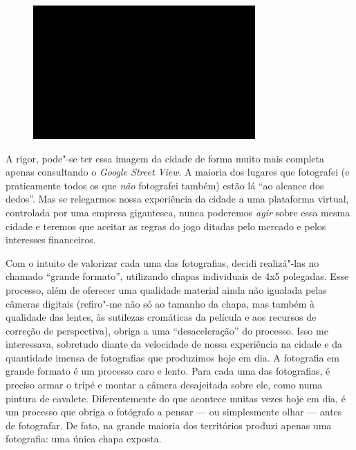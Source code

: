 \begin{figure}[!ht]

\centering
 \includegraphics[width=85mm]{./imgs/im1.jpg}
\caption{\tiny{}}

\end{figure}

A rigor, pode"-se ter essa imagem da cidade de forma muito mais completa
apenas consultando o \emph{Google Street View}. A maioria dos lugares
que fotografei (e praticamente todos os que \emph{não} fotografei
também) estão lá ``ao alcance dos dedos''. Mas se relegarmos nossa
experiência da cidade a uma plataforma virtual, controlada por uma
empresa gigantesca, nunca poderemos \emph{agir} sobre essa mesma cidade
e teremos que aceitar as regras do jogo ditadas pelo mercado e pelos
interesses financeiros.

Com o intuito de valorizar cada uma das fotografias, decidi realizá"-las
no chamado ``grande formato'', utilizando chapas individuais de 4x5
polegadas. Esse processo, além de oferecer uma qualidade material ainda
não igualada pelas câmeras digitais (refiro"-me não só ao tamanho da
chapa, mas também à qualidade das lentes, às sutilezas cromáticas da
película e aos recursos de correção de perspectiva), obriga a uma
``desaceleração'' do processo. Isso me interessava, sobretudo diante da
velocidade de nossa experiência na cidade e da quantidade imensa de
fotografias que produzimos hoje em dia. A fotografia em grande formato é
um processo caro e lento. Para cada uma das fotografias, é preciso armar
o tripé e montar a câmera desajeitada sobre ele, como numa pintura de
cavalete. Diferentemente do que acontece muitas vezes hoje em dia, é um
processo que obriga o fotógrafo a pensar --- ou simplesmente olhar ---
antes de fotografar. De fato, na grande maioria dos territórios produzi
apenas uma fotografia: uma única chapa exposta.

